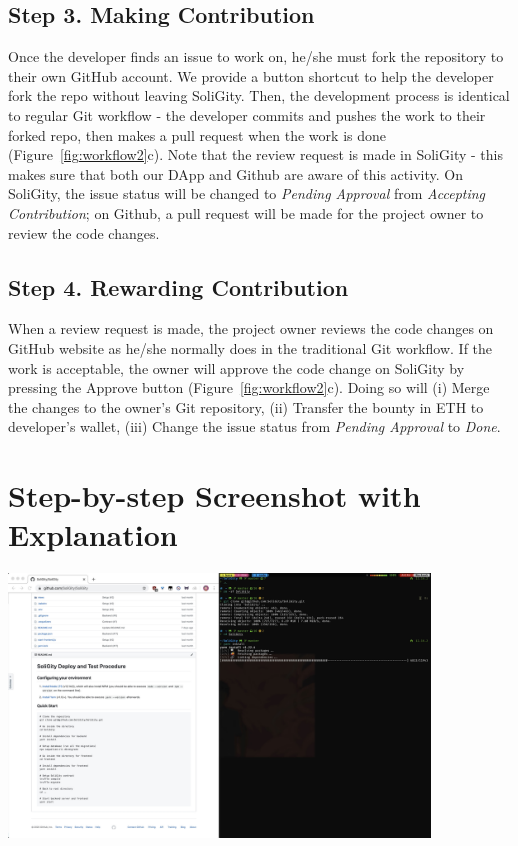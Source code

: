 \documentclass[12pt]{article}
\renewcommand{\_}{\kern-1.5pt\textunderscore\kern-1.5pt}
\begin{document}
\subsection*{Step 3. Making Contribution}

Once the developer finds an issue to work on, he/she must fork the repository to their own GitHub account. We provide a button shortcut to help the developer fork the repo without leaving SoliGity. Then, the development process is identical to regular Git workflow - the developer commits and pushes the work to their forked repo, then makes a pull request when the work is done (Figure~\ref{fig:workflow2}c). Note that the review request is made in SoliGity - this makes sure that both our DApp and Github are aware of this activity. On SoliGity, the issue status will be changed to \textit{Pending Approval} from \textit{Accepting Contribution}; on Github, a pull request will be made for the project owner to review the code changes.

\subsection*{Step 4. Rewarding Contribution}
When a review request is made, the project owner reviews the code changes on GitHub website as he/she normally does in the traditional Git workflow. If the work is acceptable, the owner will approve the code change on SoliGity by pressing the Approve button (Figure~\ref{fig:workflow2}c). Doing so will (i) Merge the changes to the owner’s Git repository, 
(ii) Transfer the bounty in ETH to developer’s wallet, 
(iii) Change the issue status from \textit{Pending Approval} to \textit{Done}.


\section{Step-by-step Screenshot with Explanation}

\includegraphics[height=7cm]{graphs/01. git_clone}
\end{document}
